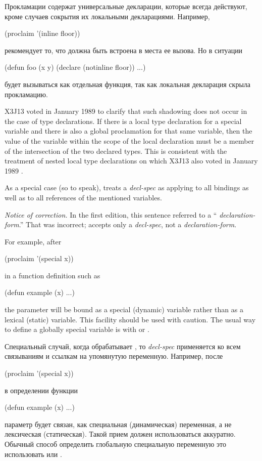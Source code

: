 \begin{defun}[Function]
Прокламации содержат универсальные декларации, которые всегда действуют, кроме
случаев сокрытия их локальными декларациями. Например,
\begin{lisp}
(proclaim '(inline floor))
\end{lisp}
рекомендует то, что  должна быть встроена в места ее вызова. Но в
ситуации 
\begin{lisp}
(defun foo (x y) (declare (notinline floor)) ...)
\end{lisp}
 будет вызываться как отдельная функция, так как локальная декларация
скрыла прокламацию.

\begin{newer}
X3J13 voted in January 1989 
to clarify that such shadowing does not occur in the case of type declarations.
If there is a local type declaration for a special variable and there is also a global
proclamation for that same variable, then the value of the variable within the scope
of the local declaration must be a member of the intersection of the two
declared types.
This is consistent with the treatment of nested local type declarations
on which X3J13 also voted in January 1989 .
\end{newer}

As a special case (so to speak),  treats a 
\emph{decl-spec} as applying to all bindings as well as to
all references of the mentioned variables.
\begin{new}%
\emph{Notice of correction.}
In the first edition, this sentence referred to a ``
\emph{declaration-form}.''  That was incorrect;  accepts
only a \emph{decl-spec}, not a \emph{declaration-form}.
\end{new}

For example, after
\begin{lisp}
(proclaim '(special x))
\end{lisp}
in a function definition such as
\begin{lisp}
(defun example (x) ...)
\end{lisp}
the parameter  will be bound as a special (dynamic) variable
rather than as a lexical (static) variable.  This facility should
be used with caution.  The usual way to define a globally special
variable is with  or .
\end{defun}

Специальный случай, когда  обрабатывает , то
\emph{decl-spec} применяется ко всем связываниям и ссылкам на упомянутую 
переменную.
Например, после
\begin{lisp}
(proclaim '(special x))
\end{lisp}
в определении функции
\begin{lisp}
(defun example (x) ...)
\end{lisp}
параметр  будет связан, как специальная (динамическая) переменная, а не
лексическая (статическая). Такой прием должен использоваться аккуратно. Обычный
способ определить глобальную специальную переменную это использовать
 или .

